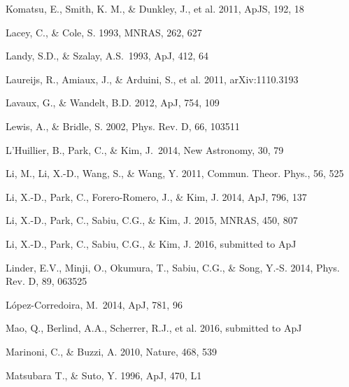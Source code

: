 \documentclass[iop]{emulateapj}
\begin{document}
\begin{thebibliography}{}
Komatsu, E., Smith, K. M., \& Dunkley, J., et al. 2011, ApJS, 192, 18  

Lacey, C., \& Cole, S. 1993, MNRAS, 262, 627


Landy, S.D., \& Szalay, A.S.\ 1993, ApJ, 412, 64 

Laureijs, R., Amiaux, J., \& Arduini, S., et al. 2011, arXiv:1110.3193

Lavaux, G., \& Wandelt, B.D. 2012, ApJ, 754, 109  


Lewis, A., \& Bridle, S. 2002, Phys. Rev. D, 66, 103511

L'Huillier, B., Park, C., \& Kim, J.\ 2014, New Astronomy, 30, 79 

Li, M., Li, X.-D., Wang, S., \& Wang, Y. 2011, Commun. Theor. Phys., 56, 525

Li, X.-D., Park, C., Forero-Romero, J., \& Kim, J. 2014, ApJ, 796, 137

Li, X.-D., Park, C., Sabiu, C.G., \& Kim, J. 2015, MNRAS, 450, 807 

Li, X.-D., Park, C., Sabiu, C.G., \& Kim, J. 2016, submitted to ApJ



Linder, E.V., Minji, O., Okumura, T., Sabiu, C.G., \& Song, Y.-S. 2014, Phys. Rev. D, 89, 063525  

L{\'o}pez-Corredoira, M.\ 2014, ApJ, 781, 96 

Mao, Q., Berlind, A.A., Scherrer, R.J., et al. 2016, submitted to ApJ

Marinoni, C., \& Buzzi, A. 2010, Nature, 468, 539  

Matsubara T., \& Suto, Y. 1996, ApJ, 470, L1  


\end{thebibliography}
\end{document}
